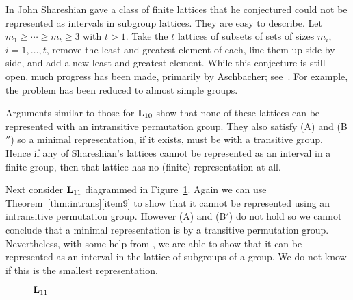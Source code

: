 In \cite{Shareshian2003} John Shareshian gave a class of finite lattices that
he conjectured could not be represented as intervals in subgroup lattices.
They are easy to describe. Let $m_1 \ge \cdots \ge m_t \ge 3$ with $t> 1$.
Take the $t$ lattices of subsets of sets of sizes $m_i$, $i=1,\ldots,t$, remove
the least and greatest element of each, line them up side by side, and add
a new least and greatest element. While this conjecture is still open, much
progress has been made, primarily by Aschbacher; see~\cite{Aschbacher2013}.
For example, the problem has been reduced to almost simple groups.


Arguments similar to those for $\bL_{10}$
show that none of these lattices can be represented with an intransitive
permutation group. They also satisfy (A) and (B$''$) so a minimal representation,
if it exists, must be with a transitive group. Hence if any of
Shareshian's lattices cannot be represented as an interval in a finite group,
then that lattice has no (finite) representation at all.








Next consider $\bL_{11}$ diagrammed in Figure~\ref{fig:L11}. Again we
can use Theorem~\ref{thm:intrans}\eqref{item9} to show that it cannot
be represented using an intransitive permutation group. However (A) and
(B$'$) do not hold so we cannot conclude that a minimal representation
is by a transitive permutation group. Nevertheless, with some help from
\gap, we are able to show that it can be represented as an interval
in the lattice of subgroups of a group. We do not know if this is the
smallest representation.


\begin{figure}[htb]
\begin{center}
  \begin{tikzpicture}[scale=1]
    
  \end{tikzpicture}
\end{center}
\caption{$\bL_{11}$}\label{fig:L11}
\end{figure}


